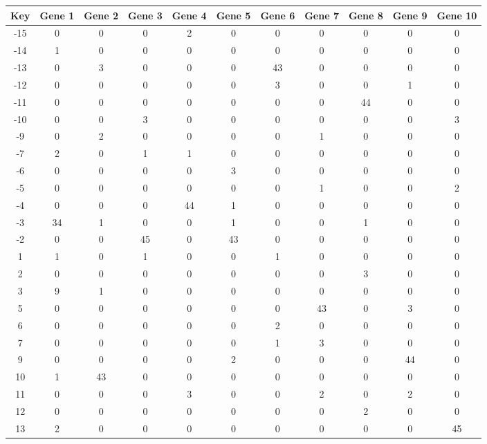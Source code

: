 \begin{tabular}{|c|c|c|c|c|c|c|c|c|c|c|}
\hline
Key & Gene 1 & Gene 2 & Gene 3 & Gene 4 & Gene 5 & Gene 6 & Gene 7 & Gene 8 & Gene 9 & Gene 10 \\
\hline
-15 & 0 & 0 & 0 & 2 & 0 & 0 & 0 & 0 & 0 & 0 \\
-14 & 1 & 0 & 0 & 0 & 0 & 0 & 0 & 0 & 0 & 0 \\
-13 & 0 & 3 & 0 & 0 & 0 & 43 & 0 & 0 & 0 & 0 \\
-12 & 0 & 0 & 0 & 0 & 0 & 3 & 0 & 0 & 1 & 0 \\
-11 & 0 & 0 & 0 & 0 & 0 & 0 & 0 & 44 & 0 & 0 \\
-10 & 0 & 0 & 3 & 0 & 0 & 0 & 0 & 0 & 0 & 3 \\
-9 & 0 & 2 & 0 & 0 & 0 & 0 & 1 & 0 & 0 & 0 \\
-7 & 2 & 0 & 1 & 1 & 0 & 0 & 0 & 0 & 0 & 0 \\
-6 & 0 & 0 & 0 & 0 & 3 & 0 & 0 & 0 & 0 & 0 \\
-5 & 0 & 0 & 0 & 0 & 0 & 0 & 1 & 0 & 0 & 2 \\
-4 & 0 & 0 & 0 & 44 & 1 & 0 & 0 & 0 & 0 & 0 \\
-3 & 34 & 1 & 0 & 0 & 1 & 0 & 0 & 1 & 0 & 0 \\
-2 & 0 & 0 & 45 & 0 & 43 & 0 & 0 & 0 & 0 & 0 \\
1 & 1 & 0 & 1 & 0 & 0 & 1 & 0 & 0 & 0 & 0 \\
2 & 0 & 0 & 0 & 0 & 0 & 0 & 0 & 3 & 0 & 0 \\
3 & 9 & 1 & 0 & 0 & 0 & 0 & 0 & 0 & 0 & 0 \\
5 & 0 & 0 & 0 & 0 & 0 & 0 & 43 & 0 & 3 & 0 \\
6 & 0 & 0 & 0 & 0 & 0 & 2 & 0 & 0 & 0 & 0 \\
7 & 0 & 0 & 0 & 0 & 0 & 1 & 3 & 0 & 0 & 0 \\
9 & 0 & 0 & 0 & 0 & 2 & 0 & 0 & 0 & 44 & 0 \\
10 & 1 & 43 & 0 & 0 & 0 & 0 & 0 & 0 & 0 & 0 \\
11 & 0 & 0 & 0 & 3 & 0 & 0 & 2 & 0 & 2 & 0 \\
12 & 0 & 0 & 0 & 0 & 0 & 0 & 0 & 2 & 0 & 0 \\
13 & 2 & 0 & 0 & 0 & 0 & 0 & 0 & 0 & 0 & 45 \\
\hline
\end{tabular}